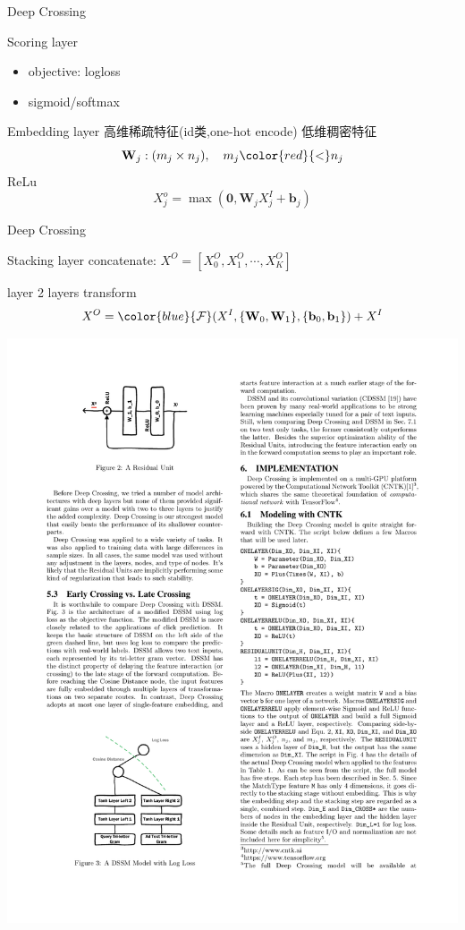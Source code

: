 \documentclass{ctexbeamer}
\begin{document}
\begin{frame}{Deep Crossing}
	\begin{block}{Scoring layer}
		\begin{itemize}
			\item objective: logloss
			\item sigmoid/softmax
		\end{itemize}
	\end{block}
	\begin{block}{Embedding layer}
		高维稀疏特征(id类,one-hot encode) {\color{red}{$\to$}} 低维稠密特征
		$$\mathbf{W}_j: (m_j \times n_j),\quad m_j {\color{red}{<}} n_j$$
		ReLu $$X_j^o = \max (\mathbf{0},\mathbf{W}_j X_j^I + \mathbf{b}_j )$$
	\end{block}
\end{frame}

\begin{frame}{Deep Crossing}
	\begin{block}{Stacking layer}
		concatenate: $X^O = [X_0^O,X_1^O,\cdots,X_K^O]$
	\end{block}
	\begin{block}{{\color{blue}{Residual}} layer}
		2 layers {\color{blue}{ReLu}} transform
		$$X^O = {\color{blue}{\cal F}}(X^I,\{\mathbf{W}_0,\mathbf{W}_1\},\{\mathbf{b}_0,\mathbf{b}_1\})+X^I$$
    \begin{center}
		\includegraphics[width=.5\textwidth]{res_unit}
	\end{center}
	\end{block}
\end{frame}
\end{document}
